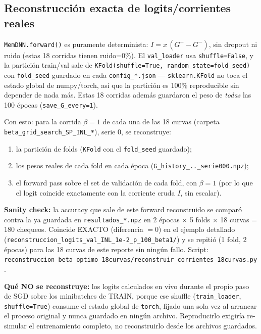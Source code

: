 \documentclass[11pt]{article}
\begin{document}
\subsection{Reconstrucción exacta de logits/corrientes reales}

\texttt{MemDNN.forward()} es puramente determinista: $I=x\,(G^+-G^-)$, sin
dropout ni ruido (estas 18 corridas tienen ruido=0\%). El \texttt{val\_loader}
usa \texttt{shuffle=False}, y la partición train/val sale de
\texttt{KFold(shuffle=True, random\_state=fold\_seed)} con \texttt{fold\_seed}
guardado en cada \texttt{config\_*.json} --- \texttt{sklearn.KFold} no toca
el estado global de numpy/torch, así que la partición es 100\% reproducible
sin depender de nada más. Estas 18 corridas además guardaron el peso de
\emph{todas} las 100 épocas (\texttt{save\_G\_every=1}).

Con esto: para la corrida $\beta=1$ de cada una de las 18 curvas (carpeta
\texttt{beta\_grid\_search\_SP\_INL\_*}), serie 0, se reconstruye:
\begin{enumerate}
\item la partición de folds (\texttt{KFold} con el \texttt{fold\_seed}
  guardado);
\item los pesos reales de cada fold en cada época
  (\texttt{G\_history\_..\_serie000.npz});
\item el forward pass sobre el set de validación de cada fold, con
  $\beta=1$ (por lo que el logit coincide exactamente con la corriente
  cruda $I$, sin escalar).
\end{enumerate}
\textbf{Sanity check:} la accuracy que sale de este forward reconstruido se
comparó contra la ya guardada en \texttt{resultados\_*.npz} en 2 épocas
$\times$ 5 folds $\times$ 18 curvas = 180 chequeos. Coincide EXACTO
(diferencia $=0$) en el ejemplo detallado
(\texttt{reconstruccion\_logits\_val\_INL\_1e-2\_p\_100\_beta1/}) y se
repitió (1 fold, 2 épocas) para las 18 curvas de este reporte sin ningún
fallo. Script:
\texttt{reconstruccion\_beta\_optimo\_18curvas/reconstruir\_corrientes\_18curvas.py}.

\textbf{Qué NO se reconstruye:} los logits calculados en vivo durante el
propio paso de SGD sobre los minibatches de TRAIN, porque ese shuffle
(\texttt{train\_loader}, \texttt{shuffle=True}) consume el estado global de
\texttt{torch}, fijado una sola vez al arrancar el proceso original y nunca
guardado en ningún archivo. Reproducirlo exigiría re-simular el
entrenamiento completo, no reconstruirlo desde los archivos guardados.
\end{document}
